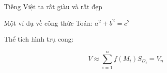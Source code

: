 \documentclass[a4paper,12pt]{article} %
\begin{document}
Tiếng Việt ta rất giàu và rất đẹp

Một ví dụ về công thức Toán: $ a^2 + b^2 = c^2 $

Thể tích hình trụ cong:

$$ V \approx \sum_{i=1}^n f(M_{i}) S_{D_i} = V_{n} $$
\end{document}
